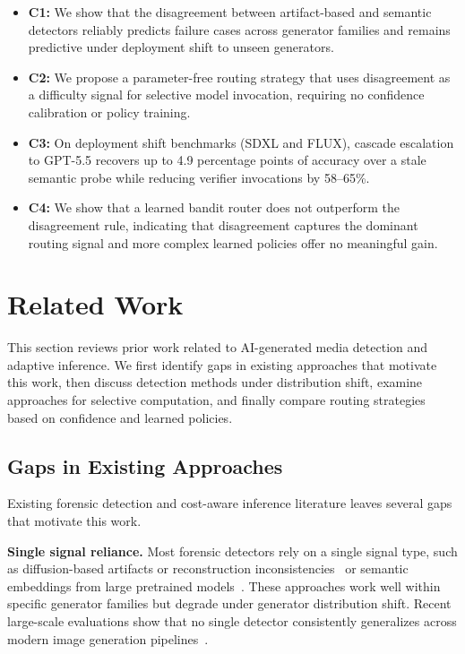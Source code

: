 \documentclass{ieeeaccess}
\begin{document}
\begin{itemize}
    \item \textbf{C1:} We show that the disagreement between artifact-based and semantic detectors reliably predicts failure cases across generator families and remains
    predictive under deployment shift to unseen generators.
    
    \item \textbf{C2:} We propose a parameter-free routing strategy that uses disagreement as a difficulty signal for selective model invocation, requiring no confidence
    calibration or policy training.
    
    \item \textbf{C3:} On deployment shift benchmarks (SDXL and FLUX), cascade escalation to GPT-5.5 recovers up to 4.9 percentage points of accuracy over a stale semantic probe while reducing verifier invocations by 58--65\%.
    
    \item \textbf{C4:} We show that a learned bandit router does not outperform the disagreement rule, indicating that disagreement captures the dominant routing signal and more complex learned policies offer no meaningful gain.
\end{itemize}


\section{Related Work}
This section reviews prior work related to AI-generated media detection and adaptive inference. We first identify gaps in existing approaches that motivate this work, then discuss detection methods under distribution shift, examine approaches for selective computation, and finally compare routing strategies based on confidence and learned policies.




\subsection{Gaps in Existing Approaches}

Existing forensic detection and cost-aware inference literature leaves several gaps that motivate this work.

\textbf{Single signal reliance.} Most forensic detectors rely on a single signal type, such as diffusion-based artifacts or reconstruction inconsistencies~\cite{Corvi_2023_ICASSP} or semantic embeddings from large pretrained models~\cite{cozzolino2023raising}. These approaches work well within specific generator families but degrade under generator distribution shift. Recent large-scale evaluations show that no single detector consistently generalizes across modern image generation pipelines~\cite{epstein2023online, cozzolino2023raising}.
\end{document}
